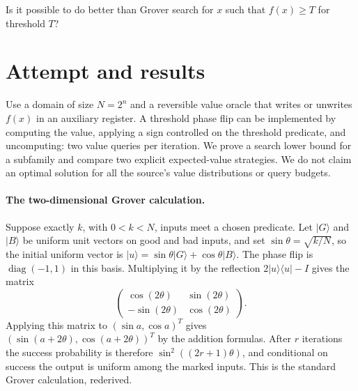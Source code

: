 \documentclass[11pt]{article}
\begin{document}
Is it possible to do better than Grover search for $x$ such that $f(x) \geq T$ for threshold $T$?

\section{Attempt and results}
Use a domain of size $N=2^n$ and a reversible value oracle that writes or
unwrites $f(x)$ in an auxiliary register. A threshold phase flip can be
implemented by computing the value, applying a sign controlled on the
threshold predicate, and uncomputing: two value queries per iteration.
We prove a search lower bound for a subfamily and compare two explicit
expected-value strategies. We do not claim an optimal solution for all the
source's value distributions or query budgets.

\paragraph{The two-dimensional Grover calculation.}
Suppose exactly $k$, with $0<k<N$, inputs meet a chosen predicate. Let
$|G\rangle$ and $|B\rangle$ be uniform unit vectors on good and bad inputs,
and set $\sin\theta=\sqrt{k/N}$, so the initial uniform vector is
$|u\rangle=\sin\theta|G\rangle+\cos\theta|B\rangle$.
The phase flip is $\operatorname{diag}(-1,1)$ in this basis. Multiplying it
by the reflection $2|u\rangle\langle u|-I$ gives the matrix
\[
\begin{pmatrix}\cos(2\theta)&\sin(2\theta)\\
-\sin(2\theta)&\cos(2\theta)\end{pmatrix}.
\]
Applying this matrix to $(\sin a,\cos a)^T$ gives
$(\sin(a+2\theta),\cos(a+2\theta))^T$ by the addition formulas.
After $r$ iterations the success probability is therefore
$\sin^2((2r+1)\theta)$, and conditional on success the output is uniform
among the marked inputs. This is the standard Grover calculation, rederived.
\end{document}
